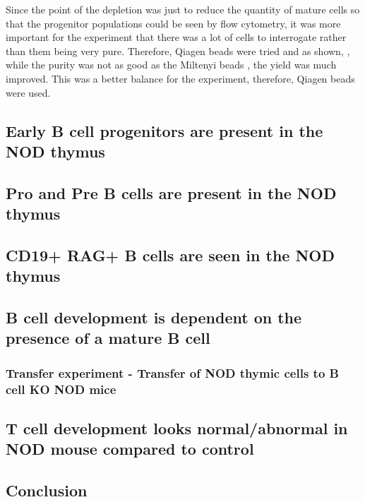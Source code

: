 Since the point of the depletion was just to reduce the quantity of mature cells so that the progenitor populations could be seen by flow cytometry, it was more important for the experiment that there was a lot of cells to interrogate rather than them being very pure.
Therefore, Qiagen beads were tried and as shown, , while the purity was not as good as the Miltenyi beads , the yield was much improved.
This was a better balance for the experiment, therefore, Qiagen beads were used.

\subsection{Early B cell progenitors are present in the NOD thymus}

\subsection{Pro and Pre B cells are present in the NOD thymus}

\subsection{CD19+ RAG+ B cells are seen in the NOD thymus}


\subsection{B cell development is dependent on the presence of a mature B cell}
\subsubsection{Transfer experiment - Transfer of NOD thymic cells to B cell KO NOD mice}

\subsection{T cell development looks normal/abnormal in NOD mouse compared to control}

\subsection{Conclusion}




